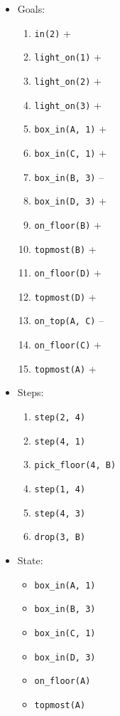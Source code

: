 \documentclass[12pt]{article}
\begin{document}
\begin{enumerate}
\begin{itemize}
      \item Goals:
        \begin{enumerate}
          \item \texttt{in(2)} +
          \item \texttt{light\_on(1)} +
          \item \texttt{light\_on(2)} +
          \item \texttt{light\_on(3)} +
          \item \texttt{box\_in(A, 1)} +
          \item \texttt{box\_in(C, 1)} +
          \item \texttt{box\_in(B, 3)} --
          \item \texttt{box\_in(D, 3)} +
          \item \texttt{on\_floor(B)} +
          \item \texttt{topmost(B)} +
          \item \texttt{on\_floor(D)} +
          \item \texttt{topmost(D)} +
          \item \texttt{on\_top(A, C)} --
          \item \texttt{on\_floor(C)} +
          \item \texttt{topmost(A)} +
        \end{enumerate}
      \item Steps:
        \begin{enumerate}
          \item \texttt{step(2, 4)}
          \item \texttt{step(4, 1)}
          \item \texttt{pick\_floor(4, B)}
          \item \texttt{step(1, 4)}
          \item \texttt{step(4, 3)}
          \item \texttt{drop(3, B)}
        \end{enumerate}
      \item State:
        \begin{itemize}
          \item \texttt{box\_in(A, 1)}
          \item \texttt{box\_in(B, 3)}
          \item \texttt{box\_in(C, 1)}
          \item \texttt{box\_in(D, 3)}
          \item \texttt{on\_floor(A)}
          \item \texttt{topmost(A)}

\end{itemize}
\end{itemize}
\end{enumerate}
\end{document}
